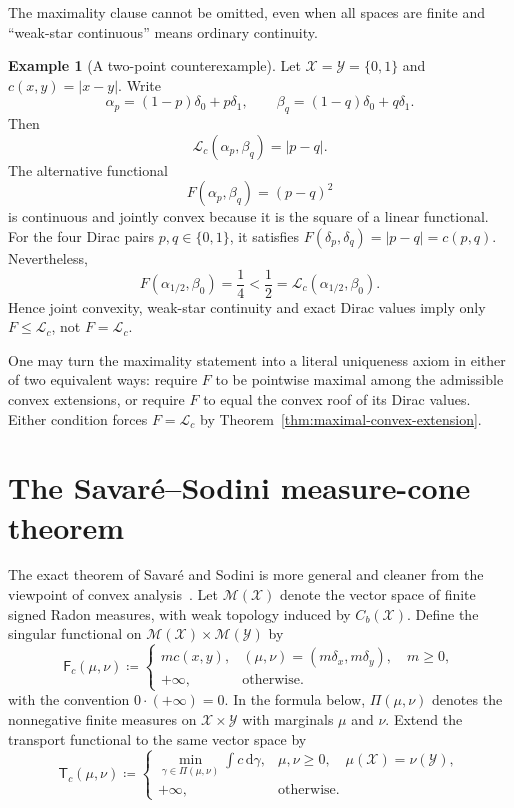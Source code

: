 \documentclass[11pt]{article}
\theoremstyle{definition}
\newtheorem{example}[theorem]{Example}
\theoremstyle{remark}
\newcommand{\Mcal}{\mathcal M}
\newcommand{\Lc}{\mathcal L_c}
\newcommand{\PiC}{\Pi}
\newcommand{\dd}{\,\mathrm d}
\begin{document}
The maximality clause cannot be omitted, even when all spaces are finite and
``weak-star continuous'' means ordinary continuity.

\begin{example}[A two-point counterexample]
Let $\mathcal X=\mathcal Y=\{0,1\}$ and $c(x,y)=|x-y|$. Write
\[
  \alpha_p=(1-p)\delta_0+p\delta_1,
  \qquad
  \beta_q=(1-q)\delta_0+q\delta_1.
\]
Then
\[
  \Lc(\alpha_p,\beta_q)=|p-q|.
\]
The alternative functional
\[
  F(\alpha_p,\beta_q)=(p-q)^2
\]
is continuous and jointly convex because it is the square of a linear
functional. For the four Dirac pairs $p,q\in\{0,1\}$, it satisfies
$F(\delta_p,\delta_q)=|p-q|=c(p,q)$. Nevertheless,
\[
  F(\alpha_{1/2},\beta_0)=\frac14
  <\frac12=\Lc(\alpha_{1/2},\beta_0).
\]
Hence joint convexity, weak-star continuity and exact Dirac values imply only
$F\leq\Lc$, not $F=\Lc$.
\end{example}

One may turn the maximality statement into a literal uniqueness axiom in
either of two equivalent ways: require $F$ to be pointwise maximal among the
admissible convex extensions, or require $F$ to equal the convex roof of its
Dirac values. Either condition forces $F=\Lc$ by
Theorem~\ref{thm:maximal-convex-extension}.

\section{The Savar\'e--Sodini measure-cone theorem}

The exact theorem of Savar\'e and Sodini is more general and cleaner from the
viewpoint of convex analysis~\cite[Theorem~4.4]{SavareSodini2022}. Let
$\Mcal(\mathcal X)$ denote the vector space of finite signed Radon measures,
with weak topology induced by $C_b(\mathcal X)$. Define the singular
functional on $\Mcal(\mathcal X)\times\Mcal(\mathcal Y)$ by
\begin{equation}\label{eq:singular-dirac-functional}
  \mathsf F_c(\mu,\nu)
  \coloneqq
  \begin{cases}
    m c(x,y),
      & (\mu,\nu)=(m\delta_x,m\delta_y),\quad m\geq0,\\
    +\infty, & \text{otherwise}.
  \end{cases}
\end{equation}
with the convention $0\cdot(+\infty)=0$. In the formula below,
$\PiC(\mu,\nu)$ denotes the nonnegative finite measures on
$\mathcal X\times\mathcal Y$ with marginals $\mu$ and $\nu$. Extend the
transport functional to the same vector space by
\begin{equation}\label{eq:cone-transport-functional}
  \mathsf T_c(\mu,\nu)
  \coloneqq
  \begin{cases}
    \displaystyle\min_{\gamma\in\PiC(\mu,\nu)}\int c\dd\gamma,
      & \mu,\nu\geq0,\quad \mu(\mathcal X)=\nu(\mathcal Y),\\
    +\infty, & \text{otherwise}.
  \end{cases}
\end{equation}
\end{document}
